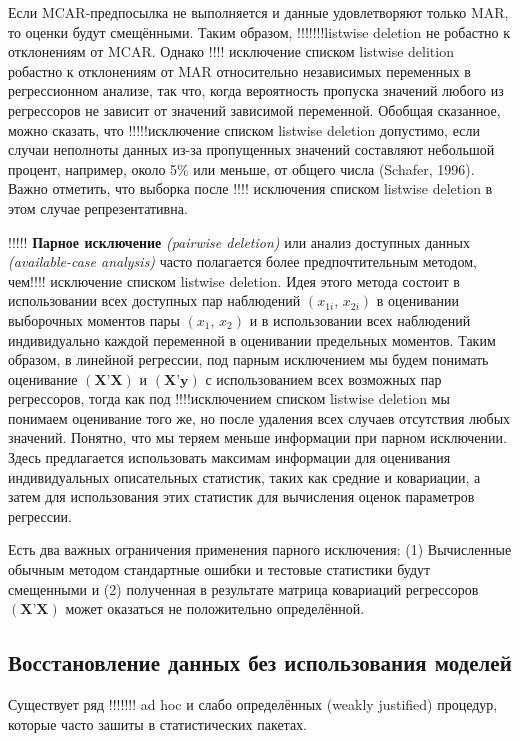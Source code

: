 Если MCAR-предпосылка не выполняется и данные удовлетворяют только MAR, то оценки будут смещёнными. Таким образом, !!!!!!!listwise deletion не робастно к отклонениям от MCAR. Однако !!!! исключение списком listwise delition робастно к отклонениям от MAR относительно независимых переменных в регрессионном анализе, так что, когда вероятность пропуска значений любого из регрессоров не зависит от значений зависимой переменной. Обобщая сказанное, можно сказать, что !!!!!исключение списком listwise deletion допустимо, если случаи неполноты данных из-за пропущенных значений составляют небольшой процент, например, около 5\% или меньше, от общего числа (Schafer, 1996). Важно отметить, что выборка после !!!! исключения списком listwise deletion в этом случае репрезентативна. 



!!!!! {\bf Парное исключение} \emph{(pairwise deletion)} или анализ доступных данных \emph{(available-case analysis)} часто полагается более предпочтительным методом, чем!!!! исключение списком listwise deletion. Идея этого метода состоит в использовании всех доступных пар наблюдений $(x_{1i}, \, x_{2i})$ в оценивании выборочных моментов пары $(x_1, \, x_2)$ и в использовании всех наблюдений индивидуально каждой переменной  в оценивании предельных моментов. Таким образом, в линейной регрессии, под парным исключением мы будем понимать оценивание $(\mathbf{X’X})$ и $(\mathbf{X’y})$ с использованием всех возможных пар регрессоров, тогда как под !!!!исключением списком listwise deletion мы понимаем оценивание того же, но после удаления всех случаев отсутствия любых значений. Понятно, что мы теряем меньше информации при парном исключении. Здесь предлагается использовать максимам информации для оценивания индивидуальных описательных статистик, таких как средние и ковариации, а затем для использования этих статистик для вычисления оценок параметров регрессии.

Есть два важных ограничения применения парного исключения: (1) Вычисленные обычным методом стандартные ошибки и тестовые статистики будут смещенными и (2) полученная в результате матрица ковариаций регрессоров $(\mathbf{X’X})$ может оказаться не положительно определённой.

\subsection{Восстановление данных без использования моделей} 

Существует ряд !!!!!!! ad hoc и слабо определённых (weakly justified) процедур, которые часто зашиты в статистических пакетах.


